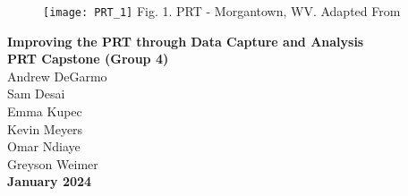 \begin{titlepage}
    \begin{center}
        \begin{figure}[t]
            \texttt{[image: PRT\_1]}
            Fig. 1. PRT - Morgantown, WV. Adapted From \cite{M_2018}
        \end{figure}
        \fontsize{24}{28}\selectfont
        \textbf{Improving the PRT through Data Capture and Analysis}\\
        \vspace{0.25cm}
        \vspace*{\fill}
        \fontsize{10}{11}\selectfont
        \textbf{PRT Capstone (Group 4)}\\
        Andrew DeGarmo\\
        Sam Desai\\
        Emma Kupec\\
        Kevin Meyers\\
        Omar Ndiaye\\
        Greyson Weimer\\
        \vspace*{\fill}
        \textbf{January 2024}\\
    \end{center}
\end{titlepage}